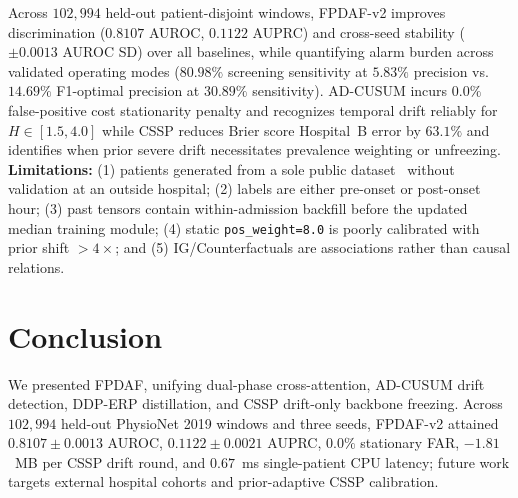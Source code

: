 \documentclass{llncs}
\begin{document}
Across $102{,}994$ held-out patient-disjoint windows, FPDAF-v2 improves discrimination ($0.8107$ AUROC, $0.1122$ AUPRC) and cross-seed stability ($\pm 0.0013$ AUROC SD) over all baselines, while quantifying alarm burden across validated operating modes ($80.98\%$ screening sensitivity at $5.83\%$ precision vs.\ $14.69\%$ F1-optimal precision at $30.89\%$ sensitivity). AD-CUSUM incurs $0.0\%$ false-positive cost stationarity penalty and recognizes temporal drift reliably for $H\in[1.5,4.0]$ while CSSP reduces Brier score Hospital~B error by $63.1\%$ and identifies when prior severe drift necessitates prevalence weighting or unfreezing. \textbf{Limitations:} (1) patients generated from a sole public dataset~\cite{23} without validation at an outside hospital; (2) labels are either pre-onset or post-onset hour; (3) past tensors contain within-admission backfill before the updated median training module; (4) static \texttt{pos\_weight=8.0} is poorly calibrated with prior shift $>4\times$; and (5) IG/Counterfactuals are associations rather than causal relations.

\section{Conclusion}

We presented FPDAF, unifying dual-phase cross-attention, AD-CUSUM drift detection, DDP-ERP distillation, and CSSP drift-only backbone freezing. Across $102{,}994$ held-out PhysioNet 2019 windows and three seeds, FPDAF-v2 attained $0.8107\pm 0.0013$ AUROC, $0.1122\pm 0.0021$ AUPRC, $0.0\%$ stationary FAR, $-1.81$~MB per CSSP drift round, and $0.67$~ms single-patient CPU latency; future work targets external hospital cohorts and prior-adaptive CSSP calibration.
\end{document}
